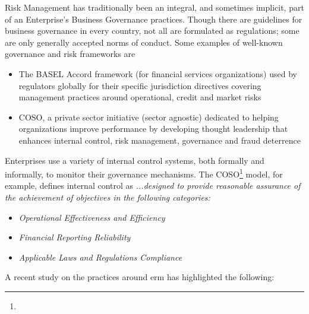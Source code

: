 %
%

Risk Management has traditionally been an integral, and sometimes implicit, part of an Enterprise’s
Business Governance practices.
Though there are guidelines for business governance in every country, not all are formulated as regulations;
some are only generally accepted norms of conduct\cite{integration_of_risk_management}.
Some examples of well-known governance and risk frameworks are

\begin{itemize}
    \item The BASEL Accord framework (for financial services organizations) used by regulators globally for their
          specific jurisdiction directives covering management practices around operational, credit and market risks
    \item COSO, a private sector initiative (sector agnostic) dedicated to helping organizations improve
          performance by developing thought leadership that enhances internal control, risk management,
          governance and fraud deterrence
\end{itemize}

Enterprises use a variety of internal control systems, both formally and informally,
to monitor their governance mechanisms.
The COSO\footnote{} model\autocite{erm_integrating_with_strategy_and_performance},
for example, defines internal control as
\textit{...designed to provide reasonable assurance of the achievement of objectives in the following categories:}

\begin{itemize}
    \item \textit{Operational Effectiveness and Efficiency}
    \item \textit{Financial Reporting Reliability}
    \item \textit{Applicable Laws and Regulations Compliance}
\end{itemize}

A recent study\autocite{erm_the_state_of_risk_oversight}
on the practices around \gls{erm} has highlighted the following:

